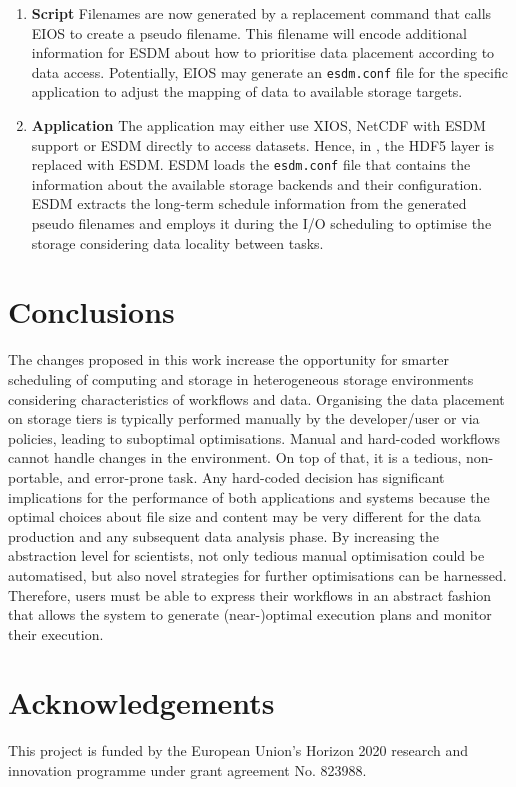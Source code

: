 \documentclass{superfri}
\begin{document}
\begin{enumerate}
  \item \textbf{Script}
  Filenames are now generated by a replacement command that calls EIOS to create a pseudo filename.
  This filename will encode additional information for ESDM about how to prioritise data placement according to data access.
  Potentially, EIOS may generate an \texttt{esdm.conf} file for the specific application to adjust the mapping of data to available storage targets.

  \item \textbf{Application}
  The application may either use XIOS, NetCDF with ESDM support or ESDM directly to access datasets.
  Hence, in , the HDF5 layer is replaced with ESDM.
  ESDM loads the \texttt{esdm.conf} file that contains the information about the available storage backends and their configuration.
  ESDM extracts the long-term schedule information from the generated pseudo filenames and employs it during the I/O scheduling to optimise the storage considering data locality between tasks.

\end{enumerate}

\section{Conclusions}
\label{sec:conclusions}

The changes proposed in this work increase the opportunity for smarter scheduling of computing and storage in heterogeneous storage environments considering characteristics of workflows and data.
Organising the data placement on storage tiers is typically performed manually by the developer/user or via policies, leading to suboptimal optimisations.
Manual and hard-coded workflows cannot handle changes in the environment. On top of that, it is a tedious, non-portable, and error-prone task.
Any hard-coded decision has significant implications for the performance of both applications and systems because the optimal choices about file size and content may be very different for the data production and any subsequent data analysis phase.
By increasing the abstraction level for scientists, not only tedious manual optimisation could be automatised, but also novel strategies for further optimisations can be harnessed.
Therefore, users must be able to express their workflows in an abstract fashion that allows the system to generate (near-)optimal execution plans and monitor their execution.

\section*{Acknowledgements}

\small
This project is funded by the European Union's Horizon 2020 research and innovation programme under grant agreement No. 823988.

\openaccess


\end{document}
